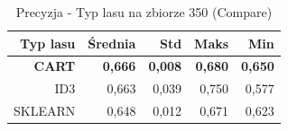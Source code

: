 \begin{table}[htbp]
\centering
\small
\setlength{\tabcolsep}{6pt}
\renewcommand{\arraystretch}{1.2}
\caption{Precyzja - Typ lasu na zbiorze 350 (Compare)}
\label{tab:Compare_on_350_precision}
\begin{tabular}{r|r|r|r|r}
\toprule
Typ lasu & Średnia & Std & Maks & Min \\
\hline
\textbf{CART} & \textbf{0,666} & \textbf{0,008} & \textbf{0,680} & \textbf{0,650} \\
ID3 & 0,663 & 0,039 & 0,750 & 0,577 \\
SKLEARN & 0,648 & 0,012 & 0,671 & 0,623 \\
\bottomrule
\end{tabular}
\end{table}
